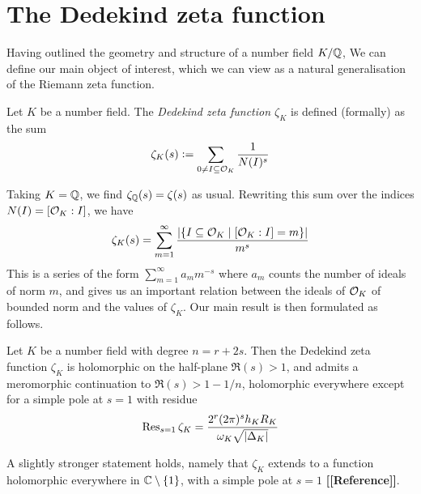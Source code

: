\documentclass[11pt]{report}
\begin{document}









\section{The Dedekind zeta function}
Having outlined the geometry and structure of a number field $K / \mathbb{Q}$, We can define our main object of interest, which we can view as a natural generalisation of the Riemann zeta function.
\begin{definition}
    Let $K$ be a number field. The \emph{Dedekind zeta function $\zeta_K$} is defined (formally) as the sum
    $$
        \zeta_K(s) \vcentcolon= \sum_{0 \neq I \subseteq \mathcal{O}_K} \frac1{N(I)^s}
    $$
\end{definition}
Taking $K = \mathbb{Q}$, we find $\zeta_{\mathbb{Q}}(s) = \zeta(s)$ as usual. Rewriting this sum over the indices $N(I) = [\mathcal{O}_K : I]$, we have
$$
    \zeta_K(s) = \sum_{m = 1}^\infty \frac{\left| \left\{  I \subseteq \mathcal{O}_K \mid [\mathcal{O}_K : I] = m  \right\} \right|}{m^s}
$$
This is a series of the form $\sum_{m = 1}^\infty a_mm^{-s}$ where $a_m$ counts the number of ideals of norm $m$, and gives us an important relation between the ideals of $\mathcal{O}_K$ of bounded norm and the values of $\zeta_K$. Our main result is then formulated as follows.
\begin{theorem}\label{acnf1}
    Let $K$ be a number field with degree $n = r + 2s$. Then the Dedekind zeta function $\zeta_K$ is holomorphic on the half-plane $\Re(s) > 1$, and admits a meromorphic continuation to $\Re(s) > 1 - 1/n$, holomorphic everywhere except for a simple pole at $s = 1$ with residue
    $$
        \operatorname{Res}_{s = 1}\zeta_K = \frac{2^r(2\pi)^sh_KR_K}{\omega_K\sqrt{\left| \Delta_K \right|}}
    $$
\end{theorem}
A slightly stronger statement holds, namely that $\zeta_K$ extends to a function holomorphic everywhere in $\mathbb{C} \setminus \left\{  1  \right\}$, with a simple pole at $s = 1$ \textbf{[[Reference]]}.
\end{document}
